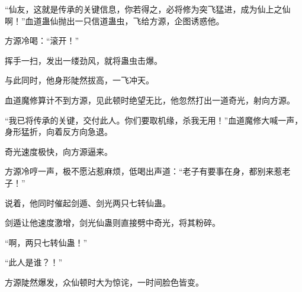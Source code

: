\begin{this_body}
“仙友，这就是传承的关键信息，你若得之，必将修为突飞猛进，成为仙上之仙啊！”血道蛊仙抛出一只信道蛊虫，飞给方源，企图诱惑他。

方源冷喝：“滚开！”

挥手一扫，发出一缕劲风，就将蛊虫击爆。

与此同时，他身形陡然拔高，一飞冲天。

血道魔修算计不到方源，见此顿时绝望无比，他忽然打出一道奇光，射向方源。

“我已将传承的关键，交付此人。你们要取机缘，杀我无用！”血道魔修大喊一声，身形猛折，向着反方向急退。

奇光速度极快，向方源逼来。

方源冷哼一声，极不愿沾惹麻烦，低喝出声道：“老子有要事在身，都别来惹老子！”

说着，他同时催起剑遁、剑光两只七转仙蛊。

剑遁让他速度激增，剑光仙蛊则直接劈中奇光，将其粉碎。

“啊，两只七转仙蛊！”

“此人是谁？！”

方源陡然爆发，众仙顿时大为惊诧，一时间脸色皆变。

\end{this_body}

